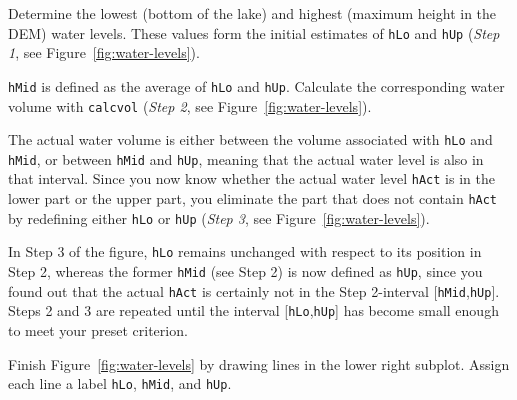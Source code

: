 \begin{action}
Determine the lowest (bottom of the lake) and highest (maximum height in the DEM) water levels. These values form the initial estimates of {\tt hLo} and {\tt hUp} (\textit{Step 1}, see Figure~\ref{fig:water-levels}).
\end{action}
\begin{action}
{\tt hMid} is defined as the average of {\tt hLo} and {\tt hUp}. Calculate the corresponding water volume with {\tt calcvol} (\textit{Step 2}, see Figure~\ref{fig:water-levels}).
\end{action}

\noindent The actual water volume is either between the volume associated with {\tt hLo} and {\tt hMid}, or between {\tt hMid} and {\tt hUp}, meaning that the actual water level is also in that interval. Since you now know whether the actual water level {\tt hAct} is in the lower part or the upper part, you eliminate the part that does not contain {\tt hAct} by redefining either {\tt hLo} or {\tt hUp} (\textit{Step 3}, see Figure~\ref{fig:water-levels}).

\noindent In Step 3 of the figure, {\tt hLo} remains unchanged with respect to its position in Step 2, whereas the former {\tt hMid} (see Step 2) is now defined as {\tt hUp}, since you found out that the actual {\tt hAct} is certainly not in the Step 2-interval [{\tt hMid},{\tt hUp}]. Steps 2 and 3 are repeated until the interval [{\tt hLo},{\tt hUp}] has become small enough to meet your preset criterion.

\begin{action}
Finish Figure~\ref{fig:water-levels} by drawing lines in the lower right subplot. Assign each line a label {\tt hLo}, {\tt hMid}, and {\tt hUp}.
\end{action}

